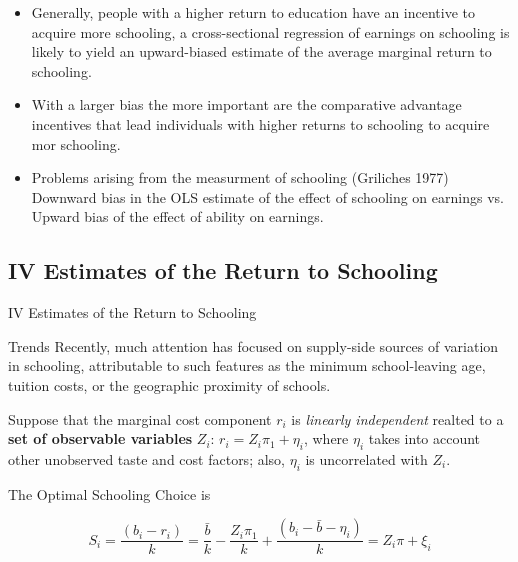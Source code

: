 \documentclass{beamer}
\begin{document}
\begin{frame}{}
\begin{itemize}
    \item Generally, people with a higher return to education have an incentive to acquire more schooling, a cross-sectional regression of earnings on schooling is likely to yield an upward-biased estimate of the average marginal return to schooling.
    
    \item With a larger bias the more important are the comparative advantage incentives that lead individuals with higher returns to schooling to acquire mor schooling. 
    
    \item Problems arising from the measurment of schooling (Griliches 1977) Downward bias in the OLS estimate of the effect of schooling on earnings vs. Upward bias of the effect of ability on earnings. 
\end{itemize}

    
\end{frame}


\subsection{IV Estimates of the Return to Schooling}
\begin{frame}{IV Estimates of the Return to Schooling}
\begin{block}{Trends}
 Recently, much attention has focused on supply-side sources of variation in schooling, attributable to such features as the minimum school-leaving age, tuition costs, or the geographic proximity of schools.
\end{block}    

Suppose that the marginal cost component $r_{i}$ is \textit{linearly independent} realted to a \textbf{set of observable variables} $Z_{i}$: $r_{i}= Z_{i}\pi_{1} + \eta_{i}$, where $\eta_{i}$ takes into account other unobserved taste and cost factors; also, $\eta_{i}$ is uncorrelated with $Z_{i}$.

The Optimal Schooling Choice is

\begin{equation} \tag{4'}
S_{i} = \frac{(b_{i}-r_{i})}{k}  =   \frac{\bar{b}}{k}-\frac{Z_{i}\pi_{1}}{k} + \frac{(b_{i}-\bar{b}-\eta_{i})}{k}  =   Z_{i}\pi + \xi_{i}
    
\end{equation}

\end{frame}
\end{document}
